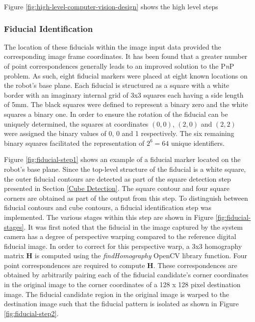Figure \ref{fig:high-level-computer-vision-design} shows the high level steps

\subsubsection{Fiducial Identification}
The location of these fiducials within the image input data provided the corresponding image frame coordinates. It has been found that a greater number of point correspondences generally leads to an improved solution to the P\textit{n}P problem. As such, eight fiducial markers were placed at eight known locations on the robot's base plane. Each fiducial is structured as a square with a white border with an imaginary internal grid of 3x3 squares each having a side length of 5mm. The black squares were defined to represent a binary zero and the white squares a binary one. In order to ensure the rotation of the fiducial can be uniquely determined, the squares at coordinates $(0, 0)$, $(2, 0)$ and $(2,2)$ were assigned the binary values of 0, 0 and 1 respectively. The six remaining binary squares facilitated the representation of $2^6=64$ unique identifiers. 

Figure \ref{fig:fiducial-step1} shows an example of a fiducial marker located on the robot's base plane. Since the top-level structure of the fiducial is a white square, the outer fiducial contours are detected as part of the square detection step presented in Section \ref{Cube Detection}. The square contour and four square corners are obtained as part of the output from this step. To distinguish between fiducial contours and cube contours, a fiducial identification step was implemented. The various stages within this step are shown in Figure \ref{fig:fiducial-stages}. It was first noted that the fiducial in the image captured by the system camera has a degree of perspective warping compared to the reference digital fiducial image. In order to correct for this perspective warp, a 3x3 homography matrix \textbf{H} is computed using the \textit{findHomography} OpenCV library function. Four point correspondences are required to compute \textbf{H}. These correspondences are obtained by arbitrarily pairing each of the fiducial candidate's corner coordinates in the original image to the corner coordinates of a 128 x 128 pixel destination image. The fiducial candidate region in the original image is warped to the destination image such that the fiducial pattern is isolated as shown in Figure \ref{fig:fiducial-step2}.

